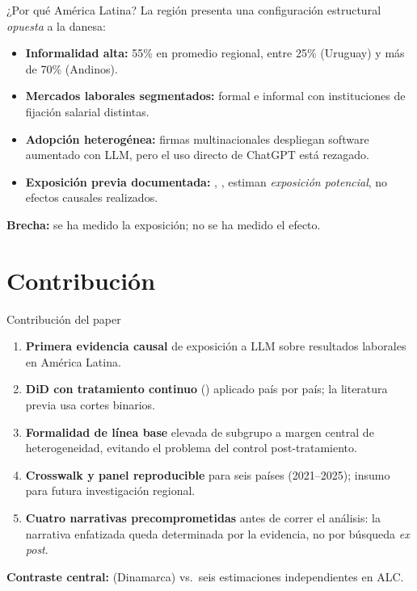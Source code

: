 \documentclass[9pt, aspectratio=169]{beamer}
\begin{document}
\begin{frame}{¿Por qué América Latina?}
  La región presenta una configuración estructural \emph{opuesta} a la danesa:
  \vfill
  \begin{itemize}
    \setlength\itemsep{0.5em}
    \item \textbf{Informalidad alta:} 55\% en promedio regional, entre 25\% (Uruguay) y más de 70\% (Andinos).
    \item \textbf{Mercados laborales segmentados:} formal e informal con instituciones de fijación salarial distintas.
    \item \textbf{Adopción heterogénea:} firmas multinacionales despliegan software aumentado con LLM, pero el uso directo de ChatGPT está rezagado.
    \item \textbf{Exposición previa documentada:} \citet{Azuara2024_idb_ai}, \citet{Ciaschi2025_distributive_ai}, \citet{EganadelSol2025_ai_lac} estiman \emph{exposición potencial}, no efectos causales realizados.
  \end{itemize}
  \vfill
  \textbf{Brecha:} se ha medido la exposición; no se ha medido el efecto.
\end{frame}

\section{Contribución}

\begin{frame}{Contribución del paper}
  \begin{enumerate}
    \setlength\itemsep{0.4em}
    \item \textbf{Primera evidencia causal} de exposición a LLM sobre resultados laborales en América Latina.
    \item \textbf{DiD con tratamiento continuo} (\citet{CallawayCGBS2024_continuous}) aplicado país por país; la literatura previa usa cortes binarios.
    \item \textbf{Formalidad de línea base} elevada de subgrupo a margen central de heterogeneidad, evitando el problema del control post-tratamiento.
    \item \textbf{Crosswalk y panel reproducible} para seis países (2021--2025); insumo para futura investigación regional.
    \item \textbf{Cuatro narrativas precomprometidas} antes de correr el análisis: la narrativa enfatizada queda determinada por la evidencia, no por búsqueda \emph{ex post}.
  \end{enumerate}
  \vfill
  \textbf{Contraste central:} \citet{HumlumVestergaard2025_llm} (Dinamarca) vs.\ seis estimaciones independientes en ALC.
\end{frame}
\end{document}
